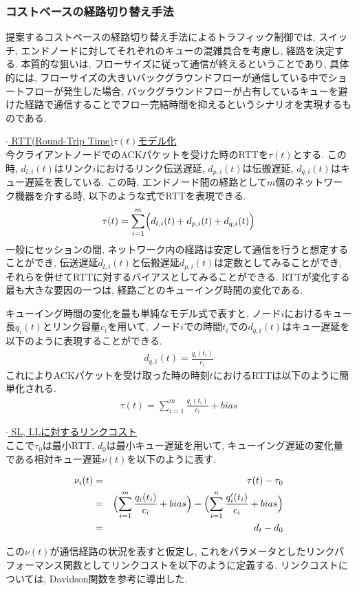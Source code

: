 \subsubsection{コストベースの経路切り替え手法}

提案するコストベースの経路切り替え手法によるトラフィック制御では, スイッチ, エンドノードに対してそれぞれのキューの混雑具合を考慮し, 経路を決定する.
本質的な狙いは, フローサイズに従って通信が終えるということであり, 具体的には,
フローサイズの大きいバックグラウンドフローが通信している中でショートフローが発生した場合,
バックグラウンドフローが占有しているキューを避けた経路で通信することでフロー完結時間を抑えるというシナリオを実現するものである.

\underline{$\cdot$ RTT(Round-Trip Time)$\tau(t)$モデル化} \\
今クライアントノードでのACKパケットを受けた時のRTTを$\tau(t)$とする. 
この時, $d_{l, i}(t)$はリンク$i$におけるリンク伝送遅延, $d_{p, i}(t)$は伝搬遅延, $d_{q,
i}(t)$はキュー遅延を表している. 
この時, エンドノード間の経路として$m$個のネットワーク機器を介する時, 以下のような式でRTTを表現できる. 
\begin{eqnarray}
\tau(t) = \sum ^m _{i=1} \Bigl(d_{l, i}(t) + d_{p, i}(t) + d_{q, i}(t)  \Bigr)
\end{eqnarray}
一般にセッションの間, ネットワーク内の経路は安定して通信を行うと想定することができ, 伝送遅延$d_{l, i}(t)$と伝搬遅延$d_{p,
i}(t)$は定数としてみることができ, それらを併せてRTTに対するバイアスとしてみることができる. 
RTTが変化する最も大きな要因の一つは, 経路ごとのキューイング時間の変化である. 

キューイング時間の変化を最も単純なモデル式で表すと, ノード$i$におけるキュー長$q_i(t)$とリンク容量$c_i$を用いて,
ノード$i$での時間$t_i$での$d_{q,i}(t)$はキュー遅延を以下のように表現することができる. 
\begin{eqnarray}
d_{q,i}(t) = \frac{q_i(t_i)}{c_i}
\end{eqnarray}
これによりACKパケットを受け取った時の時刻$t$におけるRTTは以下のように簡単化される. 
\begin{eqnarray}
\tau(t) = \sum ^m _{i=1} \frac{q_i(t_i)}{c_i} + bias
\end{eqnarray}

\underline{$\cdot$ SL, LLに対するリンクコスト} \\
ここで$\tau_0$は最小RTT, $d_0$は最小キュー遅延を用いて, キューイング遅延の変化量である相対キュー遅延$\nu(t)$を以下のように表す. 
\begin{center}
\begin{eqnarray}
\nu_{i}(t) &=& \tau(t) - \tau_0 \\
&=& \Bigl( \sum ^m _{i=1} \frac{q_i(t_i)}{c_i} + bias \Bigr) - \Bigl( \sum
^n_{i=1} \frac{q'_i(t_i)}{c_i} + bias \Bigr) \\
&=& d_t -d_0
\end{eqnarray}
\end{center}
この$\nu(t)$が通信経路の状況を表すと仮定し,
これをパラメータとしたリンクパフォーマンス関数\cite{bpr}としてリンクコストを以下のように定義する.
リンクコストについては, Davidson関数を参考に導出した\cite{bpr, davidson}.


